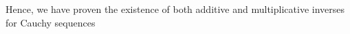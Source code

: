 \documentclass[preview]{standalone}
\begin{document}
\begin{center}
Hence, we have proven the existence of both additive and multiplicative inverses for Cauchy sequences
\end{center}
\end{document}

